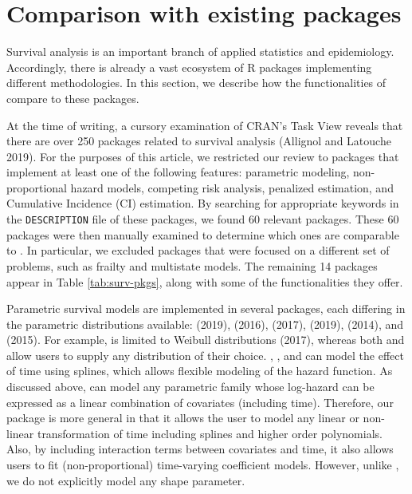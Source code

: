 \hypertarget{comparison-with-existing-packages}{%
\section{Comparison with existing packages}\label{comparison-with-existing-packages}}

Survival analysis is an important branch of applied statistics and epidemiology. Accordingly, there is already a vast ecosystem of R packages implementing different methodologies. In this section, we describe how the functionalities of  compare to these packages.

At the time of writing, a cursory examination of CRAN's  Task View reveals that there are over 250 packages related to survival analysis (Allignol and Latouche 2019). For the purposes of this article, we restricted our review to packages that implement at least one of the following features: parametric modeling, non-proportional hazard models, competing risk analysis, penalized estimation, and Cumulative Incidence (CI) estimation. By searching for appropriate keywords in the \texttt{DESCRIPTION} file of these packages, we found 60 relevant packages. These 60 packages were then manually examined to determine which ones are comparable to . In particular, we excluded packages that were focused on a different set of problems, such as frailty and multistate models. The remaining 14 packages appear in Table \ref{tab:surv-pkgs}, along with some of the functionalities they offer.

Parametric survival models are implemented in several packages, each differing in the parametric distributions available:  (2019),  (2016),  (2017),  (2019),  (2014), and  (2015). For example,  is limited to Weibull distributions (2017), whereas both  and  allow users to supply any distribution of their choice. , ,  and  can model the effect of time using splines, which allows flexible modeling of the hazard function. As discussed above,  can model any parametric family whose log-hazard can be expressed as a linear combination of covariates (including time). Therefore, our package is more general in that it allows the user to model any linear or non-linear transformation of time including splines and higher order polynomials. Also, by including interaction terms between covariates and time, it also allows users to fit (non-proportional) time-varying coefficient models. However, unlike , we do not explicitly model any shape parameter.

